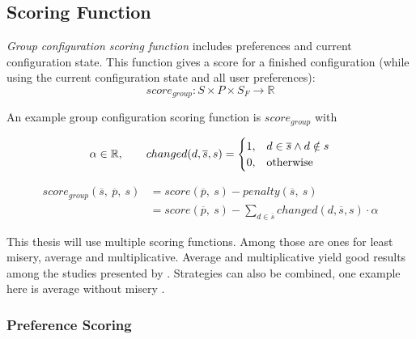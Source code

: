 


\begin{samepage}
\subsection{Scoring Function}
\label{subsec:Concept:SolutionGeneration:ScoringFunction}
\emph{Group configuration scoring function} includes preferences and current configuration state. This function gives a score for a finished configuration (while using the current configuration state and all user preferences):
\begin{equation}
    score_{group}: S \times P \times S_F \to \mathbb{R}
\end{equation}

An example group configuration scoring function is $score_{group}$ with

\begin{equation}
    \notag \alpha \in \mathbb{R}, \qquad     changed(d,\overline{s}, s) = 
    \begin{cases}
      1, & d \in \overline{s} \land d \notin s \\
      0, & \text{otherwise}
    \end{cases}
\end{equation}

\begin{equation}
    \begin{split}
        score_{group}(\overline{s},\ \overline{p},\ s)
        & = score(\overline{p},\ s) - penalty(\overline{s},\ s) \\
        & = score(\overline{p},\ s) - \sum_{d \in \overline{s}} changed(d,\overline{s}, s) \cdot \alpha
    \end{split}
\end{equation}

This thesis will use multiple scoring functions. Among those are ones for least misery, average and multiplicative. Average and multiplicative yield good results among the studies presented by \citeauthor{Masthoff2015}. Strategies can also be combined, one example here is average without misery \cite{Masthoff2015}.
\end{samepage}

\subsubsection{Preference Scoring}

